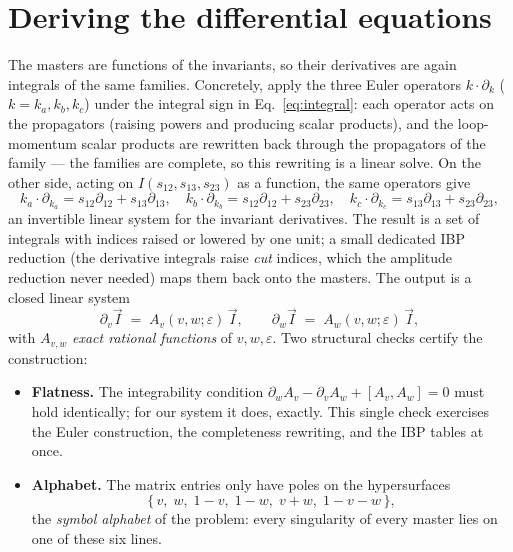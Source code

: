 \documentclass[11pt]{article}
\newcommand{\eps}{\varepsilon}
\begin{document}
\section{Deriving the differential equations}
\label{sec:derive}

The masters are functions of the invariants, so their derivatives are
again integrals of the same families.  Concretely, apply the three
Euler operators $k\!\cdot\!\partial_k$ ($k = k_a, k_b, k_c$) under
the integral sign in Eq.~\eqref{eq:integral}: each operator acts on
the propagators (raising powers and producing scalar products), and
the loop-momentum scalar products are rewritten back through the
propagators of the family --- the families are complete, so this
rewriting is a linear solve.  On the other side, acting on
$I(s_{12}, s_{13}, s_{23})$ as a function, the same operators give
\begin{equation}
  k_a\!\cdot\!\partial_{k_a} = s_{12}\partial_{12} + s_{13}\partial_{13},
  \quad
  k_b\!\cdot\!\partial_{k_b} = s_{12}\partial_{12} + s_{23}\partial_{23},
  \quad
  k_c\!\cdot\!\partial_{k_c} = s_{13}\partial_{13} + s_{23}\partial_{23},
\end{equation}
an invertible linear system for the invariant derivatives.  The
result is a set of integrals with indices raised or lowered by one
unit; a small dedicated IBP reduction (the derivative integrals raise
\emph{cut} indices, which the amplitude reduction never needed) maps
them back onto the masters.  The output is a closed linear system
\begin{equation}
  \partial_v \vec I \;=\; A_v(v,w;\eps)\, \vec I,
  \qquad
  \partial_w \vec I \;=\; A_w(v,w;\eps)\, \vec I,
  \label{eq:system}
\end{equation}
with $A_{v,w}$ \emph{exact rational functions} of $v,w,\eps$.  Two
structural checks certify the construction:
\begin{itemize}
\item \textbf{Flatness.}  The integrability condition
  $\partial_w A_v - \partial_v A_w + [A_v, A_w] = 0$ must hold
  identically; for our system it does, exactly.  This single check
  exercises the Euler construction, the completeness rewriting, and
  the IBP tables at once.
\item \textbf{Alphabet.}  The matrix entries only have poles on the
  hypersurfaces
  \begin{equation}
    \{\, v,\; w,\; 1-v,\; 1-w,\; v+w,\; 1-v-w \,\},
    \label{eq:alphabet}
  \end{equation}
  the \emph{symbol alphabet} of the problem: every singularity of
  every master lies on one of these six lines.
\end{itemize}
\end{document}
